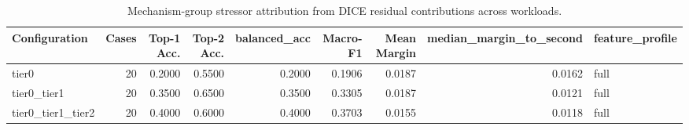 \begin{table}[t]
\centering
\caption{Mechanism-group stressor attribution from DICE residual contributions across workloads.}
\label{tab:dice_stressor_diagnosis}
\footnotesize
\begin{tabular}{lrrrrrrrl}
\toprule
Configuration & Cases & Top-1 Acc. & Top-2 Acc. & balanced_acc & Macro-F1 & Mean Margin & median_margin_to_second & feature_profile \\
\midrule
tier0 & 20 & 0.2000 & 0.5500 & 0.2000 & 0.1906 & 0.0187 & 0.0162 & full \\
tier0_tier1 & 20 & 0.3500 & 0.6500 & 0.3500 & 0.3305 & 0.0187 & 0.0121 & full \\
tier0_tier1_tier2 & 20 & 0.4000 & 0.6000 & 0.4000 & 0.3703 & 0.0155 & 0.0118 & full \\
\bottomrule
\end{tabular}

\end{table}
